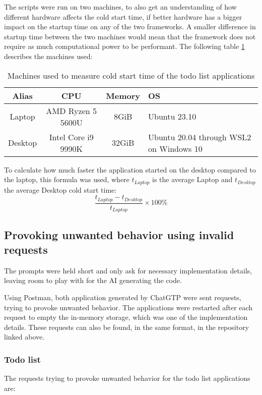 \documentclass[a4paper,titlepage]{article}
\begin{document}
\noindent The scripts were run on two machines, to also get an understanding of
how different hardware affects the cold start time, if better hardware has a
bigger impact on the startup time on any of the two frameworks. A smaller
difference in startup time between the two machines would mean that the
framework does not require as much computational power to be performant.
The following table \ref{table:cold-start-machines} describes the machines used:

\begin{table}[h!]
	\begin{tabularx}{\textwidth}{|c|c|c|X|}
		\hline
		Alias   & CPU                 & Memory & OS                                      \\
		\hline
		Laptop  & AMD Ryzen 5 5600U   & 8GiB   & Ubuntu 23.10                            \\
		Desktop & Intel Core i9 9990K & 32GiB  & Ubuntu 20.04 through WSL2 on Windows 10 \\
		\hline
	\end{tabularx}
	\caption{
		Machines used to measure cold start time of the todo list applications
	}
	\label{table:cold-start-machines}
\end{table}

\noindent To calculate how much faster the application started on the desktop
compared to the laptop, this formula was used, where $t_{Laptop}$ is the average
Laptop and $t_{Desktop}$ the average Desktop cold start time:
$$
\frac{t_{Laptop} - t_{Desktop}}{t_{Laptop}} \times 100\%
$$

\subsection{Provoking unwanted behavior using invalid requests}
The prompts were held short and only ask for necessary implementation details,
leaving room to play with for the AI generating the code.\newline

\noindent Using Postman, both application generated by ChatGTP were sent
requests, trying to provoke unwanted behavior. The applications were restarted
after each request to empty the in-memory storage, which was one of the
implementation details. These requests can also be found, in the same format,
in the repository linked above.

\subsubsection{Todo list}
The requests trying to provoke unwanted behavior for the todo list applications
are:
\end{document}
